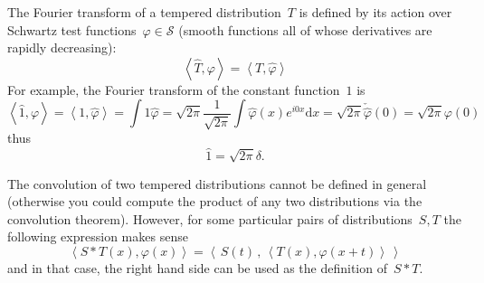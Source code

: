 \documentclass[a4paper]{article}           %
\newcommand{\1}{\mathbf{1}}
\newcommand{\ud}{\mathrm{d}}
\newcommand{\pairing}[2]{\left\langle #1,#2\right\rangle}
\begin{document}
The Fourier transform of a tempered distribution~$T$ is defined by its action
over Schwartz test functions~$\varphi\in\mathcal{S}$ (smooth functions
all of whose derivatives are rapidly decreasing):
$$
\pairing{\hat{T}}\varphi
=
\pairing{T}{\hat{\varphi}}
$$
For example, the Fourier transform of the constant function~$1$ is
$$
\pairing{\hat 1}{\varphi}
=
\pairing{1}{\hat \varphi}
=
\int 1\hat\varphi
=
\sqrt{2\pi}\frac{1}{\sqrt{2\pi}}\int \hat\varphi(x)e^{i0x}\ud x
=\sqrt{2\pi}\check{\hat{\varphi}}(0)
=\sqrt{2\pi}\varphi(0)
$$
thus
\begin{equation}
	\hat 1=\sqrt{2\pi}\delta.
	\label{eq:dirac}
\end{equation}

The convolution of two tempered distributions cannot be defined in general
(otherwise you could compute the product of any two distributions via the
convolution theorem).  However, for some particular pairs of
distributions~$S,T$ the following expression makes sense
$$
\pairing{S*T(x)}{\varphi(x)}
=
\pairing{\,S(t)\,}{\,\pairing{T(x)}{\varphi(x+t)}\,}
$$
and in that case, the right hand side can be used as the definition of~$S*T$.
\end{document}
